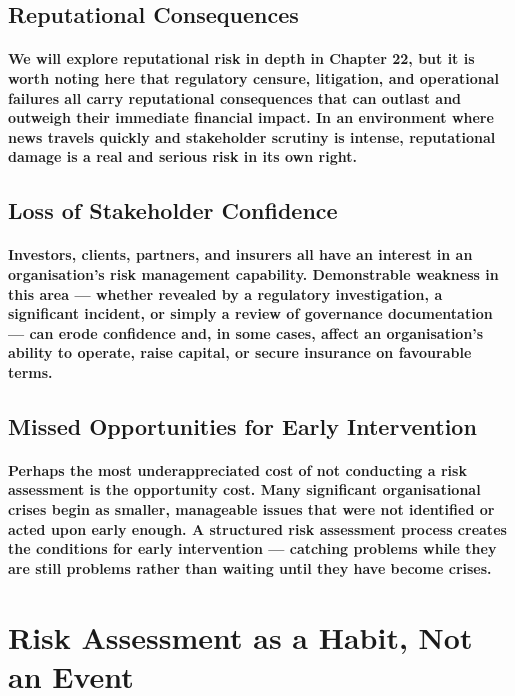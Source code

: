 \subsection{Reputational Consequences}
\paragraph{We will explore reputational risk in depth in Chapter 22, but it is worth noting here that regulatory censure, litigation, and operational failures all carry reputational consequences that can outlast and outweigh their immediate financial impact. In an environment where news travels quickly and stakeholder scrutiny is intense, reputational damage is a real and serious risk in its own right.}

\subsection{Loss of Stakeholder Confidence}
\paragraph{Investors, clients, partners, and insurers all have an interest in an organisation's risk management capability. Demonstrable weakness in this area — whether revealed by a regulatory investigation, a significant incident, or simply a review of governance documentation — can erode confidence and, in some cases, affect an organisation's ability to operate, raise capital, or secure insurance on favourable terms.}

\subsection{Missed Opportunities for Early Intervention}
\paragraph{Perhaps the most underappreciated cost of not conducting a risk assessment is the opportunity cost. Many significant organisational crises begin as smaller, manageable issues that were not identified or acted upon early enough. A structured risk assessment process creates the conditions for \textbf{early intervention} — catching problems while they are still problems rather than waiting until they have become crises.}

\newpage
\section{Risk Assessment as a Habit, Not an Event}

